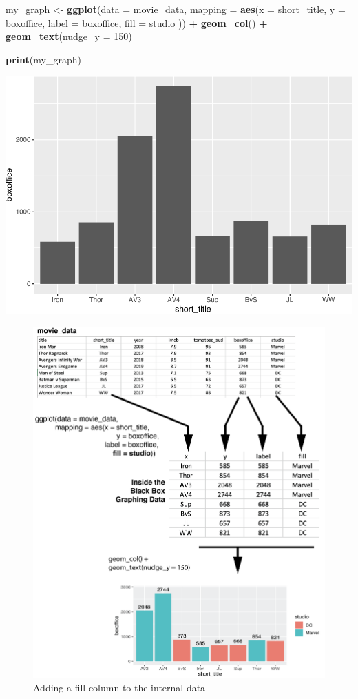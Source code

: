 \documentclass[
]{krantz}
\makeatletter
\newenvironment{Shaded}{\begin{snugshade}}{\end{snugshade}}
\newcommand{\DataTypeTok}[1]{\textcolor[rgb]{0.27,0.27,0.27}{#1}}
\newcommand{\DecValTok}[1]{\textcolor[rgb]{0.06,0.06,0.06}{#1}}
\newcommand{\KeywordTok}[1]{\textcolor[rgb]{0.27,0.27,0.27}{\textbf{#1}}}
\newcommand{\NormalTok}[1]{#1}
\newcommand{\OperatorTok}[1]{\textcolor[rgb]{0.43,0.43,0.43}{\textbf{#1}}}
\newcommand{\StringTok}[1]{\textcolor[rgb]{0.5,0.5,0.5}{#1}}
\newenvironment{kframe}{%
\medskip{}
\setlength{\fboxsep}{.8em}
 \def\at@end@of@kframe{}%
 \ifinner\ifhmode%
  \def\at@end@of@kframe{\end{minipage}}%
  \begin{minipage}{\columnwidth}%
 \fi\fi%
 \def\FrameCommand##1{\hskip\@totalleftmargin \hskip-\fboxsep
 \colorbox{shadecolor}{##1}\hskip-\fboxsep
     \hskip-\linewidth \hskip-\@totalleftmargin \hskip\columnwidth}%
 \MakeFramed {\advance\hsize-\width
   \@totalleftmargin\z@ \linewidth\hsize
   \@setminipage}}%
 {\par\unskip\endMakeFramed%
 \at@end@of@kframe}
\renewenvironment{Shaded}{\begin{kframe}}{\end{kframe}}
\makeatother
\begin{document}
\begin{Shaded}
\begin{Highlighting}[]
\NormalTok{my_graph <-}\StringTok{ }\KeywordTok{ggplot}\NormalTok{(}\DataTypeTok{data =}\NormalTok{ movie_data,}
           \DataTypeTok{mapping =} \KeywordTok{aes}\NormalTok{(}\DataTypeTok{x =}\NormalTok{ short_title,}
                         \DataTypeTok{y =}\NormalTok{ boxoffice,}
                         \DataTypeTok{label =}\NormalTok{ boxoffice,}
                         \DataTypeTok{fill =}\NormalTok{ studio )) }\OperatorTok{+}
\StringTok{  }\KeywordTok{geom_col}\NormalTok{() }\OperatorTok{+}
\StringTok{  }\KeywordTok{geom_text}\NormalTok{(}\DataTypeTok{nudge_y =} \DecValTok{150}\NormalTok{) }

\KeywordTok{print}\NormalTok{(my_graph)}
\end{Highlighting}
\end{Shaded}

\includegraphics[width=0.65\linewidth]{bookdown_files/figure-latex/unnamed-chunk-256-1}

\begin{figure}
\includegraphics[width=0.7\linewidth]{ch_graphing/images/mapping_fill} \caption{Adding a fill column to the internal data}\label{fig:addfill}
\end{figure}
\end{document}
